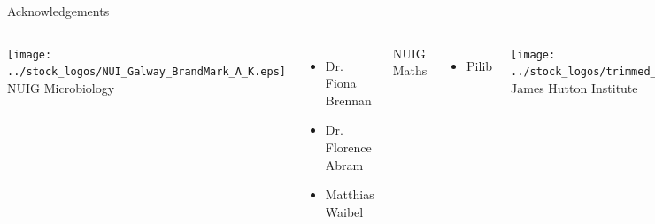\documentclass[10pt, compress]{beamer}
\begin{document}
\begin{frame}{Acknowledgements}
  \begin{columns}[onlytextwidth]
    \texttt{[image: ../stock\_logos/NUI\_Galway\_BrandMark\_A\_K.eps]}\\
     NUIG Microbiology
      \begin{itemize}
        \item Dr. Fiona Brennan
        \item Dr. Florence Abram 
        \item Matthias Waibel
      \end{itemize}
      NUIG Maths
      \begin{itemize}
        \item Pilib 
      \end{itemize}

    \texttt{[image: ../stock\_logos/trimmed\_jhi.png]}\\
      James Hutton Institute
      \begin{itemize}
        \item Leighton Pritchard
      \end{itemize}
  \end{columns}
\end{frame}



\end{document}
